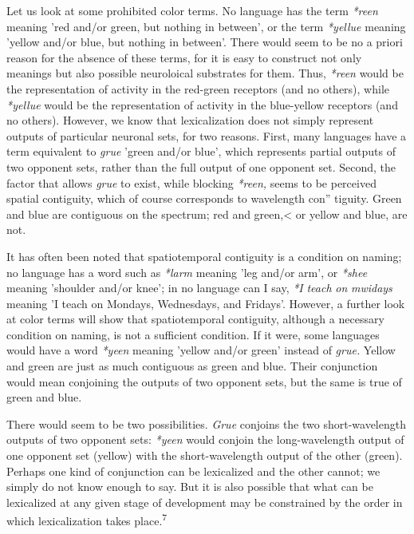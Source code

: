 Let us look at some prohibited color terms. No language has the term \textit{*reen} meaning 'red and/or green, but nothing in between', or the term \textit{*yellue} meaning 'yellow and/or blue, but nothing in between'. There would seem to be no a priori reason for the absence of these terms, for it is easy to construct not only meanings but also possible neuroloical substrates for them. Thus, \textit{*reen} would be the represen\-tation of activity in the red-green receptors (and no others), while
\textit{*yellue} would be the representation of activity in the blue-yellow receptors (and no others). However, we know that lexicalization does not simply represent outputs of particular neuronal sets, for two reasons. First, many languages have a term equivalent to \textit{grue} 'green and/or blue', which represents partial outputs of two opponent sets, rather than the full output of one opponent set. Second, the factor that allows \textit{grue} to exist, while blocking \textit{*reen,} seems to be perceived spatial contiguity, which of course corresponds to wavelength con'' tiguity. Green and blue are contiguous on the spectrum; red and green,{\textless} or yellow and blue, are not.


It has often been noted that spatiotemporal contiguity is a condition on naming; no language has a word such as \textit{*larm} meaning 'leg and/or arm', or \textit{*shee} meaning 'shoulder and/or knee'; in no lan\-guage can I say, \textit{*I} \textit{teach} \textit{on} \textit{mwidays} meaning 'I teach on Mondays, Wednesdays, and Fridays'. However, a further look at color terms will show that spatiotemporal contiguity, although a necessary condition on naming, is not a sufficient condition. If it were, some languages would have a word \textit{*yeen} meaning 'yellow and/or green' instead of \textit{grue.} Yellow and green are just as much contiguous as green and blue. Their conjunction would mean conjoining the outputs of two oppo\-nent sets, but the same is true of green and blue.

There would seem to be two possibilities. \textit{Grue }conjoins the two short-wavelength outputs of two opponent sets: \textit{*yeen} would conjoin the long-wavelength output of one opponent set (yellow) with the short-wavelength output of the other (green). Perhaps one kind of conjunction can be lexicalized and the other cannot; we simply do not know enough to say. But it is also possible that what can be lexicalized at any given stage of development may be constrained by the order in which lexicalization takes place.\textsuperscript{7}

